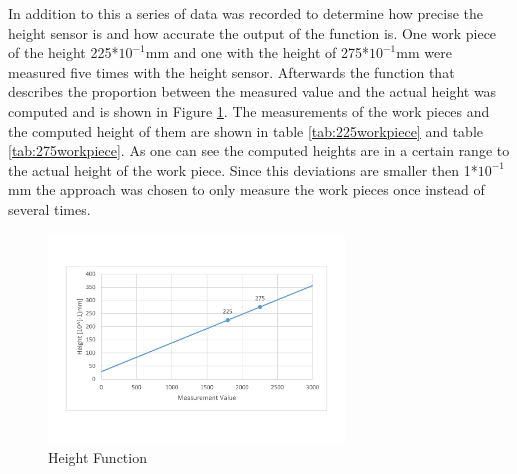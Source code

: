 In addition to this a series of data was recorded to determine how precise the height sensor is and how accurate the output of the function is. One work piece of the height 225*$10^{-1}$mm and one with the height of 275*$10^{-1}$mm were measured five times with the height sensor. Afterwards the function that describes the proportion between the measured value and the actual height was computed and is shown in Figure \ref{fig:heightfunction}. The measurements of the work pieces and the computed height of them are shown in table \ref{tab:225workpiece} and table \ref{tab:275workpiece}.
As one can see the computed heights are in a certain range to the actual height of the work piece. Since this deviations are smaller then 1*$10^{-1}$mm the approach was chosen to only measure the work pieces once instead of several times. 


\begin{figure}[H]
	\begin{center}
		\includegraphics[width=0.7\textwidth]{media/Measurements_Height_Sensor.pdf} 	
		\caption{Height Function}
		\label{fig:heightfunction}
	\end{center}
\end{figure}

